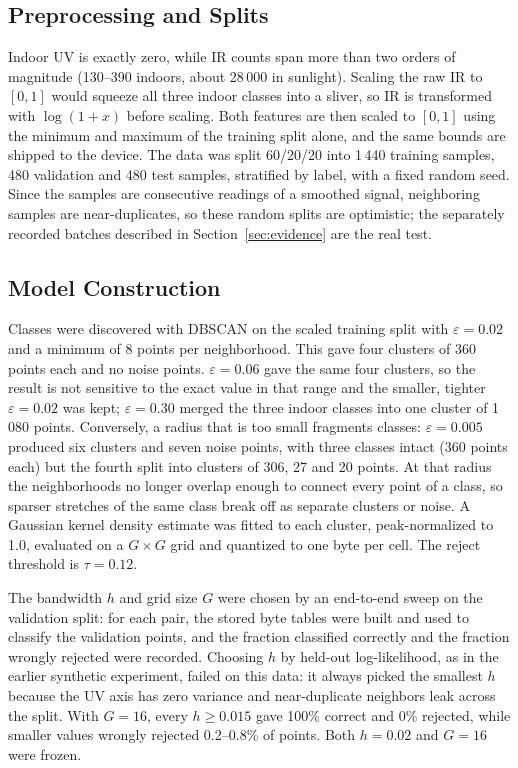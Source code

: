 \documentclass[conference]{IEEEtran}
\begin{document}
\subsection{Preprocessing and Splits}
Indoor UV is exactly zero, while IR counts span more than two orders of magnitude (130--390 indoors, about 28\,000 in sunlight). Scaling the raw IR to $[0,1]$ would squeeze all three indoor classes into a sliver, so IR is transformed with $\log(1+x)$ before scaling. Both features are then scaled to $[0,1]$ using the minimum and maximum of the training split alone, and the same bounds are shipped to the device. The data was split 60/20/20 into 1\,440 training samples, 480 validation and 480 test samples, stratified by label, with a fixed random seed. Since the samples are consecutive readings of a smoothed signal, neighboring samples are near-duplicates, so these random splits are optimistic; the separately recorded batches described in Section~\ref{sec:evidence} are the real test.

\subsection{Model Construction}
Classes were discovered with DBSCAN on the scaled training split with $\varepsilon = 0.02$ and a minimum of 8 points per neighborhood. This gave four clusters of 360 points each and no noise points. $\varepsilon = 0.06$ gave the same four clusters, so the result is not sensitive to the exact value in that range and the smaller, tighter $\varepsilon = 0.02$ was kept; $\varepsilon = 0.30$ merged the three indoor classes into one cluster of 1\,080 points.  Conversely, a radius that is too small fragments classes: $\varepsilon = 0.005$ produced six clusters and seven noise points, with three classes intact (360 points each) but the fourth split into clusters of 306, 27 and 20 points. At that radius the neighborhoods no longer overlap enough to connect every point of a class, so sparser stretches of the same class break off as separate clusters or noise.  A Gaussian kernel density estimate was fitted to each cluster, peak-normalized to 1.0, evaluated on a $G \times G$ grid and quantized to one byte per cell. The reject threshold is $\tau = 0.12$.

The bandwidth $h$ and grid size $G$ were chosen by an end-to-end sweep on the validation split: for each pair, the stored byte tables were built and used to classify the validation points, and the fraction classified correctly and the fraction wrongly rejected were recorded. Choosing $h$ by held-out log-likelihood, as in the earlier synthetic experiment, failed on this data: it always picked the smallest $h$ because the UV axis has zero variance and near-duplicate neighbors leak across the split. With $G = 16$, every $h \geq 0.015$ gave 100\% correct and 0\% rejected, while smaller values wrongly rejected 0.2--0.8\% of points.  Both $h = 0.02$ and $G = 16$ were frozen.
\end{document}
